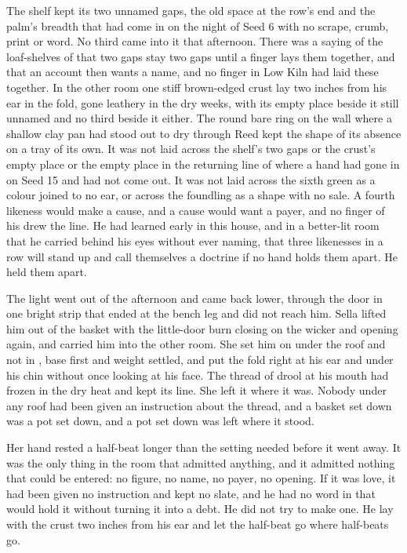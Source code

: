 The shelf kept its two unnamed gaps, the old space at the row's end and the palm's breadth that had come in on the night of Seed 6 with no scrape, crumb, print or word. No third came into it that afternoon. There was a saying of the loaf-shelves of  that two gaps stay two gaps until a finger lays them together, and that an account then wants a name, and no finger in Low Kiln had laid these together. In the other room one stiff brown-edged crust lay two inches from his ear in the fold, gone leathery in the dry weeks, with its empty place beside it still unnamed and no third beside it either. The round bare ring on the wall where a shallow clay pan had stood out to dry through Reed kept the shape of its absence on a tray of its own. It was not laid across the shelf's two gaps or the crust's empty place or the empty place in the returning line of  where a hand had gone in on Seed 15 and had not come out. It was not laid across the sixth green as a colour joined to no ear, or across the foundling as a shape with no sale. A fourth likeness would make a cause, and a cause would want a payer, and no finger of his drew the line. He had learned early in this house, and in a better-lit room that he carried behind his eyes without ever naming, that three likenesses in a row will stand up and call themselves a doctrine if no hand holds them apart. He held them apart.

\scenebreak

The light went out of the afternoon and came back lower, through the door in one bright strip that ended at the bench leg and did not reach him. Sella lifted him out of the basket with the little-door burn closing on the wicker and opening again, and carried him into the other room. She set him on  under the roof and not in , base first and weight settled, and put the fold right at his ear and under his chin without once looking at his face. The thread of drool at his mouth had frozen in the dry heat and kept its line. She left it where it was. Nobody under any roof had been given an instruction about the thread, and a basket set down was a pot set down, and a pot set down was left where it stood.

Her hand rested a half-beat longer than the setting needed before it went away. It was the only thing in the room that admitted anything, and it admitted nothing that could be entered: no figure, no name, no payer, no opening. If it was love, it had been given no instruction and kept no slate, and he had no word in  that would hold it without turning it into a debt. He did not try to make one. He lay with the crust two inches from his ear and let the half-beat go where half-beats go.

